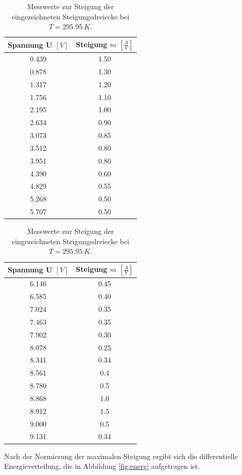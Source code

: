 \begin{table}
  \label{tab:ener}
\begin{minipage}{0.5\textwidth}
  \begin{tabular}{c|c}
    \textbf{Spannung U $[V]$} & \textbf{Steigung $m$ $[\frac{A}{V}]$}\\
    \hline
    0.439 & 1.50 \\
    0.878 & 1.30 \\
    1.317 & 1.20 \\
    1.756 & 1.10 \\
    2.195 & 1.00 \\
    2.634 & 0.90 \\
    3.073 & 0.85 \\
    3.512 & 0.80 \\
    3.951 & 0.80 \\
    4.390 & 0.60 \\
    4.829 & 0.55 \\
    5.268 & 0.50 \\
    5.707 & 0.50 
  \end{tabular}
\end{minipage}
  \hfill
\begin{minipage}{0.75\textwidth} 
  \begin{tabular}{c|c}
    \textbf{Spannung U $[V]$} & \textbf{Steigung $m$ $[\frac{A}{V}]$}\\
    \hline
    6.146 & 0.45 \\
    6.585 & 0.40 \\
    7.024 & 0.35 \\
    7.463 & 0.35 \\
    7.902 & 0.30 \\
    8.078 & 0.25 \\
    8.341 & 0.34 \\
    8.561 & 0.4 \\
    8.780 & 0.5 \\
    8.868 & 1.0 \\
    8.912 & 1.5 \\
    9.000 & 0.5 \\
    9.131 & 0.34
  \end{tabular}
\end{minipage}
  \caption{Messwerte zur Steigung der eingezeichneten Steigungsdreiecke bei $T = \SI{295.95}{K}$.}
\end{table}

Nach der Normierung der maximalen Steigung ergibt sich die differentielle Energieverteilung, die in Abbildung \ref{fig:energ} aufgetragen ist.

